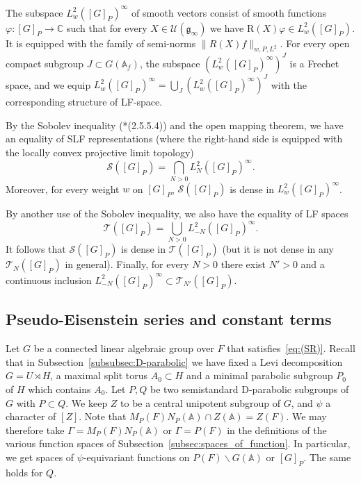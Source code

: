 \documentclass[letterpaper,11pt]{amsart}
\newcommand{\fg}{\mathfrak{g}}
\newcommand{\bA}{\mathbb{A}}
\newcommand{\C}{\mathbb{C}}
\newcommand{\cS}{\mathcal{S}}
\newcommand{\cT}{\mathcal{T}}
\newcommand{\cU}{\mathcal{U}}
\newcommand{\<}{\negthickspace}
\providecommand{\aabs}[1]{\lVert#1\rVert}
\theoremstyle{definition}
\theoremstyle{plain}
\theoremstyle{remark}
\numberwithin{equation}{section}
\begin{document}
The subspace $L^2_w([G]_P)^\infty$ of smooth vectors consist of smooth functions $\varphi : [G]_P \to \C$ such that for every $X \in \cU(\fg_\infty)$ we have $\mathrm{R}(X) \varphi \in L^2_w([G]_P)$. It is equipped with the family of semi-norms $\aabs{R(X)f}_{w,P,L^2}$. For every open compact subgroup $J \subset G(\bA_f)$, the subspace $(L^2_w([G]_P)^\infty)^J$ is a Frechet space, and we equip $L^2_w([G]_P)^\infty=\bigcup_J (L^2_w([G]_P)^\infty)^J$ with the corresponding structure of LF-space.

By the Sobolev inequality (\cite{BPCZ}*{(2.5.5.4)}) and the open mapping theorem, we have an equality of SLF representations (where the right-hand side is equipped with the locally convex projective limit topology)
\begin{equation*}
    \cS([G]_P) = \bigcap_{N>0} L^2_N([G]_P)^\infty.
\end{equation*}
Moreover, for every weight $w$ on $[G]_P$, $\cS([G]_P)$ is dense in $L^2_w([G]_P)^\infty$.

By another use of the Sobolev inequality, we also have the equality of LF spaces
\begin{equation*}
    \cT([G]_P)=\bigcup_{N>0}  L^2_{-N}([G]_P)^\infty.
\end{equation*}
It follows that $\cS([G]_P)$ is dense in $\cT([G]_P)$ (but it is not dense in any $\cT_N([G]_P)$ in general). Finally, for every $N>0$ there exist $N'>0$ and a continuous inclusion $L^2_{-N}([G]_P)^\infty \subset \cT_{N'}([G]_P)$.

















\subsection{Pseudo-Eisenstein series and constant terms}

Let $G$ be a connected linear algebraic group over $F$ that satisfies~\eqref{eq:(SR)}. Recall that in Subsection~\ref{subsubsec:D-parabolic} we have fixed a Levi
decomposition $G= U \rtimes H$, a maximal split torus $A_0 \subset H$ and a
minimal parabolic subgroup $P_0$ of $H$ which contains $A_0$. Let $P,Q$ be two
semistandard D-parabolic subgroups of $G$ with $P \subset Q$. We keep $Z$ to be a central unipotent subgroup of $G$, and $\psi$ a character of $[Z]$. Note that $M_P(F)N_P(\bA) \cap Z(\bA)=Z(F)$. We may therefore take $\Gamma = M_P(F) N_P(\bA)$ or $\Gamma = P(F)$
in the definitions of the various function spaces of Subsection~\ref{subsec:spaces_of_function}. In particular, we get spaces of $\psi$-equivariant functions on $P(F) \backslash G(\bA)$ or $[G]_P$. The same holds for $Q$.
\end{document}
